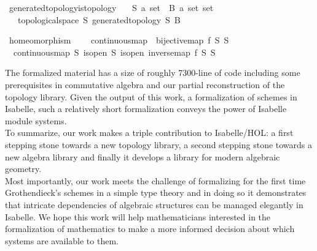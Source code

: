 \documentclass[12pt]{scrartcl}
\begin{document}
\begin{isabelle}
\isamarkupfalse%
\ generated{\isacharunderscore}{\kern0pt}topology{\isacharunderscore}{\kern0pt}is{\isacharunderscore}{\kern0pt}topology{\isacharcolon}{\kern0pt}\isanewline
\ \ \ S{\isacharcolon}{\kern0pt}{\isacharcolon}{\kern0pt}\ {\isachardoublequoteopen}{\isacharprime}{\kern0pt}a\ set{\isachardoublequoteclose}\ \ B{\isacharcolon}{\kern0pt}{\isacharcolon}{\kern0pt}\ {\isachardoublequoteopen}{\isacharprime}{\kern0pt}a\ set\ set{\isachardoublequoteclose}\isanewline
\ \ \ {\isachardoublequoteopen}topological{\isacharunderscore}{\kern0pt}space\ S\ {\isacharparenleft}{\kern0pt}generated{\isacharunderscore}{\kern0pt}topology\ S\ B{\isacharparenright}{\kern0pt}{\isachardoublequoteclose}
\end{isabelle}
\begin{isabelle}
\isamarkupfalse%
\ homeomorphism\ {\isacharequal}{\kern0pt}\ \isanewline
\ \ continuous{\isacharunderscore}{\kern0pt}map\ {\isacharplus}{\kern0pt}\ bijective{\isacharunderscore}{\kern0pt}map\ f\ S\ S{\isacharprime}{\kern0pt}\ {\isacharplus}{\kern0pt}\ \isanewline
\ \ continuous{\isacharunderscore}{\kern0pt}map\ S{\isacharprime}{\kern0pt}\ is{\isacharunderscore}{\kern0pt}open{\isacharprime}{\kern0pt}\ S\ is{\isacharunderscore}{\kern0pt}open\ {\isachardoublequoteopen}inverse{\isacharunderscore}{\kern0pt}map\ f\ S\ S{\isacharprime}{\kern0pt}{\isachardoublequoteclose}
\end{isabelle}
The formalized material has a size of roughly 7300-line of code including some prerequisites in commutative  algebra and our partial reconstruction of the topology library. Given the output of this work, a formalization of schemes in Isabelle, such a relatively short formalization conveys the power of Isabelle module systems. \\
To summarize, our work makes a triple contribution to Isabelle/HOL: a first stepping stone towards a new topology library, a second stepping stone towards a new algebra library and finally it develops a library for modern algebraic geometry. \\
Most importantly, our work meets the challenge of formalizing for the first time Grothendieck's schemes in a simple type theory and in doing so it demonstrates that intricate dependencies of algebraic structures can be managed elegantly in Isabelle. We hope this work will help mathematicians interested in the formalization of mathematics to make a more informed decision about which systems are available to them. \\
\end{document}
